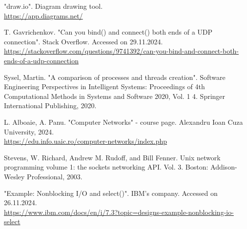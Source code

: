\documentclass[runningheads]{llncs}
\begin{document}
\begin{thebibliography}{8}

 "draw.io". Diagram drawing tool. \\ \url{https://app.diagrams.net/}

T. Gavrichenkov. "Can you bind() and connect() both ends of a UDP connection". Stack Overflow. Accessed on 29.11.2024. \\
\url{https://stackoverflow.com/questions/9741392/can-you-bind-and-connect-both-ends-of-a-udp-connection}

 Sysel, Martin. "A comparison of processes and threads creation". Software Engineering Perspectives in Intelligent Systems: Proceedings of 4th Computational Methods in Systems and Software 2020, Vol. 1 4. Springer International Publishing, 2020. \\ 

L. Alboaie, A. Panu. "Computer Networks" - course page. Alexandru Ioan Cuza University, 2024. \\
\url{https://edu.info.uaic.ro/computer-networks/index.php}

 Stevens, W. Richard, Andrew M. Rudoff, and Bill Fenner. Unix network programming volume 1: the sockets networking API. Vol. 3. Boston: Addison-Wesley Professional, 2003.

 "Example: Nonblocking I/O and select()". IBM's company. Accessed on 26.11.2024. \\
\url{https://www.ibm.com/docs/en/i/7.3?topic=designs-example-nonblocking-io-select}

\end{thebibliography}
\end{document}
